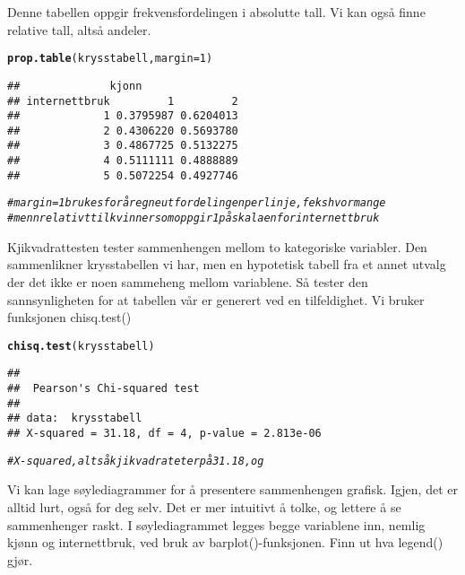 \documentclass[a4 paper, 12pt]{article}\usepackage[]{graphicx}\usepackage[]{color}
\makeatletter
\newcommand{\hlnum}[1]{\textcolor[rgb]{0.686,0.059,0.569}{#1}}%
\newcommand{\hlcom}[1]{\textcolor[rgb]{0.678,0.584,0.686}{\textit{#1}}}%
\newcommand{\hlstd}[1]{\textcolor[rgb]{0.345,0.345,0.345}{#1}}%
\newcommand{\hlkwc}[1]{\textcolor[rgb]{0.333,0.667,0.333}{#1}}%
\newcommand{\hlkwd}[1]{\textcolor[rgb]{0.737,0.353,0.396}{\textbf{#1}}}%
\newenvironment{kframe}{%
 \def\at@end@of@kframe{}%
 \ifinner\ifhmode%
  \def\at@end@of@kframe{\end{minipage}}%
  \begin{minipage}{\columnwidth}%
 \fi\fi%
 \def\FrameCommand##1{\hskip\@totalleftmargin \hskip-\fboxsep
 \colorbox{shadecolor}{##1}\hskip-\fboxsep
     \hskip-\linewidth \hskip-\@totalleftmargin \hskip\columnwidth}%
 \MakeFramed {\advance\hsize-\width
   \@totalleftmargin\z@ \linewidth\hsize
   \@setminipage}}%
 {\par\unskip\endMakeFramed%
 \at@end@of@kframe}
\newenvironment{knitrout}{}{} %
\makeatother
\begin{document}
\begin{enumerate}
         Denne tabellen oppgir frekvensfordelingen i absolutte tall. Vi kan også finne relative tall, altså andeler.
       
\begin{knitrout}\footnotesize
{}\color{fgcolor}\begin{kframe}
\begin{alltt}
  \hlkwd{prop.table}\hlstd{(krysstabell,} \hlkwc{margin} \hlstd{=} \hlnum{1}\hlstd{)}
\end{alltt}
\begin{verbatim}
##              kjonn
## internettbruk         1         2
##             1 0.3795987 0.6204013
##             2 0.4306220 0.5693780
##             3 0.4867725 0.5132275
##             4 0.5111111 0.4888889
##             5 0.5072254 0.4927746
\end{verbatim}
\begin{alltt}
\hlcom{# margin = 1 brukes for å regne ut fordelingen per linje, feks hvor mange }
\hlcom{# menn relativt til kvinner som oppgir 1 på skalaen for internettbruk }
\end{alltt}
\end{kframe}
\end{knitrout}
         
         Kjikvadrattesten tester sammenhengen mellom to kategoriske variabler. Den sammenlikner krysstabellen vi har, men en hypotetisk tabell fra et annet utvalg der det ikke er noen sammeheng mellom variablene. Så tester den sannsynligheten for at tabellen vår er generert ved en tilfeldighet. Vi bruker funksjonen chisq.test()
       
\begin{knitrout}\footnotesize
{}\color{fgcolor}\begin{kframe}
\begin{alltt}
  \hlkwd{chisq.test}\hlstd{(krysstabell)}
\end{alltt}
\begin{verbatim}
## 
## 	Pearson's Chi-squared test
## 
## data:  krysstabell
## X-squared = 31.18, df = 4, p-value = 2.813e-06
\end{verbatim}
\begin{alltt}
\hlcom{# X-squared, altså kjikvadratet er på 31.18, og }
\end{alltt}
\end{kframe}
\end{knitrout}
         
         Vi kan lage søylediagrammer for å presentere sammenhengen grafisk. Igjen, det er alltid lurt, også for deg selv. Det er mer intuitivt å tolke, og lettere å se sammenhenger raskt. I søylediagrammet legges begge variablene inn, nemlig kjønn og internettbruk, ved bruk av barplot()-funksjonen. Finn ut hva legend() gjør.
       

\end{enumerate}
\end{document}
